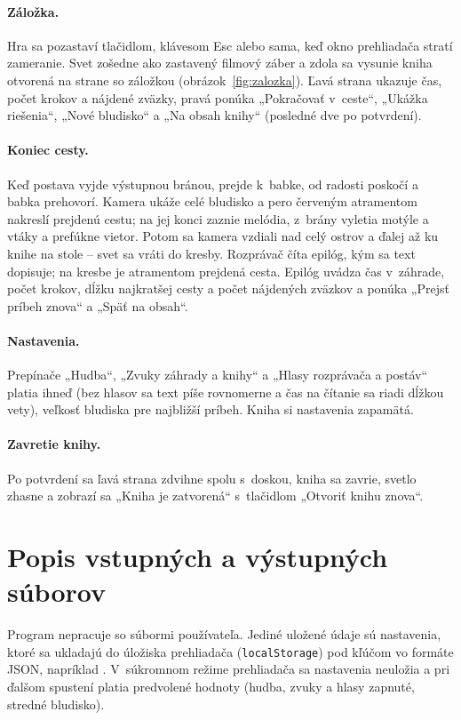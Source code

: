 \documentclass[11pt, a4paper]{article}
\begin{document}
\paragraph{Záložka.} Hra sa pozastaví tlačidlom, klávesom Esc alebo sama, keď okno prehliadača
stratí zameranie. Svet zošedne ako zastavený filmový záber a zdola sa vysunie kniha otvorená na
strane so záložkou (obrázok~\ref{fig:zalozka}). Ľavá strana ukazuje čas, počet krokov a nájdené
zväzky, pravá ponúka „Pokračovať v~ceste“, „Ukážka riešenia“, „Nové bludisko“ a „Na obsah knihy“
(posledné dve po potvrdení).

\paragraph{Koniec cesty.} Keď postava vyjde výstupnou bránou, prejde k~babke, od radosti poskočí
a babka prehovorí. Kamera ukáže celé bludisko a pero červeným atramentom nakreslí prejdenú cestu;
na jej konci zaznie melódia, z~brány vyletia motýle a vtáky a prefúkne vietor. Potom sa kamera
vzdiali nad celý ostrov a ďalej až ku knihe na stole – svet sa vráti do kresby. Rozprávač
číta epilóg, kým sa text dopisuje; na kresbe je atramentom prejdená cesta.
Epilóg uvádza čas v~záhrade, počet krokov, dĺžku najkratšej cesty a počet nájdených zväzkov
a ponúka „Prejsť príbeh znova“ a „Späť na obsah“.

\paragraph{Nastavenia.} Prepínače „Hudba“, „Zvuky záhrady a knihy“ a „Hlasy rozprávača
a postáv“ platia ihneď (bez hlasov sa text píše rovnomerne a čas na čítanie sa riadi dĺžkou vety), veľkosť
bludiska pre najbližší príbeh. Kniha si nastavenia zapamätá.

\paragraph{Zavretie knihy.} Po potvrdení sa ľavá strana zdvihne spolu s~doskou, kniha sa zavrie,
svetlo zhasne a zobrazí sa „Kniha je zatvorená“ s~tlačidlom „Otvoriť knihu znova“.

\section{Popis vstupných a výstupných súborov}

Program nepracuje so súbormi používateľa. Jediné uložené údaje sú nastavenia, ktoré sa ukladajú
do úložiska prehliadača (\texttt{localStorage}) pod kľúčom 
vo formáte JSON, napríklad .
V~súkromnom režime prehliadača sa nastavenia neuložia a pri ďalšom spustení platia predvolené
hodnoty (hudba, zvuky a hlasy zapnuté, stredné bludisko).
\end{document}
